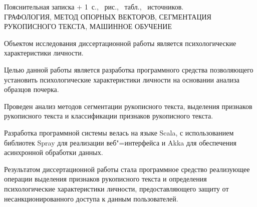 
\newcommand{\totpages}{\number\numexpr{} + 1}

\begin{center}
    Пояснительная записка \totpages~с., \totfig{}~рис., \tottab{}~табл., \totref{}~источников.
    \\ 
    \MakeUppercase{графология, метод опорных векторов, сегментация рукописного текста, машинное обучение}
\end{center}

Объектом исследования диссертационной работы является психологические характеристики личности.

Целью данной работы является разработка программного средства позволяющего установить психологические характеристики личности на основании анализа образцов почерка.

Проведен анализ методов сегментации рукописного текста, выделения признаков рукописного текста и классификации признаков рукописного текста.

Разработка программной системы велась на языке Scala, с использованием библиотек Spray для реализации веб"=интерфейса и Akka для обеспечения асинхронной обработки данных. 

Результатом диссертационной работы стала программное средство реализующее операции выделения признаков рукописного текста и определения психологические характеристики личности, предоставляющего защиту от несанкционированного доступа к данным пользователей.

\clearpage